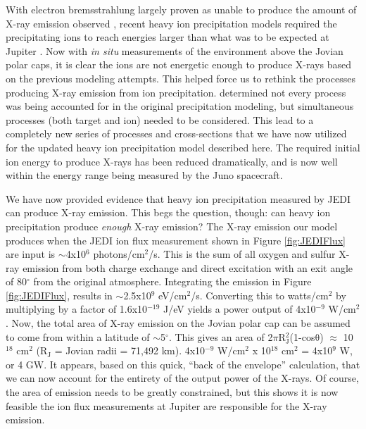 \documentclass[draft]{agujournal2018}
\begin{document}

With electron bremsstrahlung largely proven as unable to produce the amount of X-ray emission observed \citep{branduardi2004,elsner2005}, recent heavy ion precipitation models required the precipitating ions to reach energies larger than what was to be expected at Jupiter \citep{cravens1995,ozak2010,ozak2013,houston2018}.
Now with \textit{in situ} measurements of the environment above the Jovian polar caps, it is clear the ions are not energetic enough to produce X-rays based on the previous modeling attempts.
This helped force us to rethink the processes producing X-ray emission from ion precipitation.
\citet{schultz2019} determined not every process was being accounted for in the original precipitation modeling, but simultaneous processes (both target and ion) needed to be considered.
This lead to a completely new series of processes and cross-sections that we have now utilized for the updated heavy ion precipitation model described here.
The required initial ion energy to produce X-rays has been reduced dramatically, and is now well within the energy range being measured by the Juno spacecraft.

We have now provided evidence that heavy ion precipitation measured by JEDI can produce X-ray emission.
This begs the question, though: can heavy ion precipitation produce \textit{enough} X-ray emission?
The X-ray emission our model produces when the JEDI ion flux measurement shown in Figure \ref{fig:JEDIFlux} are input is $\sim$4x10$^6$ photons/cm$^2$/s.
This is the sum of all oxygen and sulfur X-ray emission from both charge exchange and direct excitation with an exit angle of 80$^{\circ}$ from the original atmosphere.
Integrating the emission in Figure \ref{fig:JEDIFlux}, results in $\sim$2.5x10$^9$ eV/cm$^2$/s.
Converting this to watts/cm$^2$ by multiplying by a factor of 1.6x10$^{-19}$ J/eV yields a power output of 4x10$^{-9}$ W/cm$^2$.
Now, the total area of X-ray emission on the Jovian polar cap can be assumed to come from within a latitude of $\sim$5$^{\circ}$.
This gives an area of 2$\pi$R$_{\mathrm{J}}^2$(1-cos$\mathrm{\theta}$) $\approx$ 10$^{18}$ cm$^2$ (R$_{\mathrm{J}}$ = Jovian radii = 71,492 km).
4x10$^{-9}$ W/cm$^2$ x 10$^{18}$ cm$^2$ = 4x10$^9$ W, or 4 GW.
It appears, based on this quick, ``back of the envelope'' calculation, that we can now account for the entirety of the output power of the X-rays.
Of course, the area of emission needs to be greatly constrained, but this shows it is now feasible the ion flux measurements at Jupiter are responsible for the X-ray emission.
\end{document}
